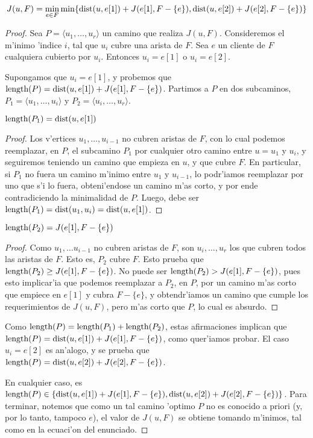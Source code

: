 \begin{theorem}
\label{th:ecuacion_minima_longitud}
\[J(u, F) = \min\limits_{e \in F} \min\{\textnormal{dist}(u, e[1]) + J(e[1], F - \{e\}), \textnormal{dist}(u, e[2]) + J(e[2], F - \{e\})\}\]

\begin{proof}
Sea $P = \langle u_1, \dots, u_r \rangle$ un camino que realiza $J(u, F)$. Consideremos el m'inimo 'indice $i$, tal que $u_i$ cubre una arista de $F$. Sea $e$ un cliente de $F$ cualquiera cubierto por $u_i$. Entonces $u_i = e[1]$ o $u_i = e[2]$.

Supongamos que $u_i = e[1]$, y probemos que $\textnormal{length}(P) = \textnormal{dist}(u, e[1]) + J(e[1], F - \{e\})$. Partimos a $P$ en dos subcaminos, $P_1 = \langle u_1, \dots, u_i \rangle$ y $P_2 = \langle u_i, \dots, u_r \rangle$.

\begin{claim}
$\textnormal{length}(P_1) = \textnormal{dist}(u, e[1])$

\begin{proof}
Los v'ertices $u_1, \dots, u_{i - 1}$ no cubren aristas de $F$, con lo cual podemos reemplazar, en $P$, el subcamino $P_1$ por cualquier otro camino entre $u = u_1$ y $u_i$, y seguiremos teniendo un camino que empieza en $u$, y que cubre $F$. En particular, si $P_1$ no fuera un camino m'inimo entre $u_1$ y $u_{i - 1}$, lo podr'iamos reemplazar por uno que s'i lo fuera, obteni'endose un camino m'as corto, y por ende contradiciendo la minimalidad de $P$. Luego, debe ser $\textnormal{length}(P_1) = \textnormal{dist}(u_1, u_i) = \textnormal{dist}(u, e[1])$.
\end{proof}
\end{claim}

\begin{claim}
$\textnormal{length}(P_2) = J(e[1], F - \{e\})$

\begin{proof}
Como $u_1, \dots u_{i - 1}$ no cubren aristas de $F$, son $u_i, \dots, u_r$ los que cubren todos las aristas de $F$. Esto es, $P_2$ cubre $F$. Esto prueba que $\textnormal{length}(P_2) \geq J(e[1], F - \{e\})$. No puede ser $\textnormal{length}(P_2) > J(e[1], F - \{e\})$, pues esto implicar'ia que podemos reemplazar a $P_2$, en $P$, por un camino m'as corto que empiece en $e[1]$ y cubra $F - \{e\}$, y obtendr'iamos un camino que cumple los requerimientos de $J(u, F)$, pero m'as corto que $P$, lo cual es absurdo.
\end{proof}
\end{claim}

Como $\textnormal{length}(P) = \textnormal{length}(P_1) + \textnormal{length}(P_2)$, estas afirmaciones implican que $\textnormal{length}(P) = \textnormal{dist}(u, e[1]) + J(e[1], F - \{e\})$, como quer'iamos probar. El caso $u_i = e[2]$ es an'alogo, y se prueba que $\textnormal{length}(P) = \textnormal{dist}(u, e[2]) + J(e[2], F - \{e\})$.

En cualquier caso, es $\textnormal{length}(P) \in \{\textnormal{dist}(u, e[1]) + J(e[1], F - \{e\}), \textnormal{dist}(u, e[2]) + J(e[2], F - \{e\})\}$. Para terminar, notemos que como un tal camino 'optimo $P$ no es conocido a priori (y, por lo tanto, tampoco $e$), el valor de $J(u, F)$ se obtiene tomando m'inimos, tal como en la ecuaci'on del enunciado.
\end{proof}
\end{theorem}

